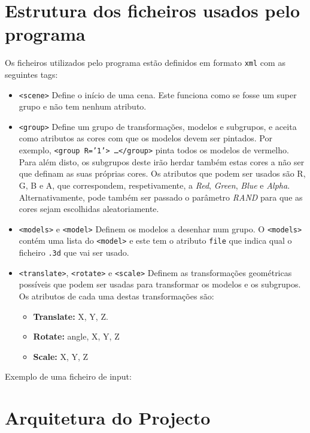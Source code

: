 \documentclass[a4paper]{article}
\begin{document}
\section{Estrutura dos ficheiros usados pelo programa}\label{sec:estrutura-ficheiros}

Os ficheiros utilizados pelo programa estão definidos em formato \texttt{xml} com as seguintes tags:
\begin{itemize}
    \item \texttt{<scene>} Define o início de uma cena. Este funciona como se fosse um super grupo e não tem nenhum atributo.
    \item \texttt{<group>} Define um grupo de transformações, modelos e
        subgrupos, e aceita como atributos as cores com que os modelos devem ser pintados.
        Por exemplo,
        \texttt{<group R='1'> \ldots </group>} pinta todos os modelos de vermelho.
        Para além disto, os subgrupos deste irão herdar também estas cores a não ser
        que definam as suas próprias cores. Os atributos que podem ser usados 
        são R, G, B e A, que correspondem, respetivamente, a \textit{Red},
        \textit{Green}, \textit{Blue} e \textit{Alpha}. Alternativamente, pode também ser passado
        o parâmetro \textit{RAND} para que as cores sejam escolhidas aleatoriamente.
    \item \texttt{<models>} e \texttt{<model>} Definem os modelos a desenhar
        num grupo. O \texttt{<models>} contém uma lista do \texttt{<model>} e este tem o atributo
        \texttt{file} que indica qual o ficheiro \texttt{.3d} que vai ser usado.
    \item \texttt{<translate>}, \texttt{<rotate>} e \texttt{<scale>} Definem as
        transformações geométricas possíveis que podem ser usadas para transformar os
        modelos e os subgrupos. Os atributos de cada uma destas transformações são:
        \begin{itemize}
            \item \textbf{Translate:} X, Y, Z.
            \item \textbf{Rotate:} angle, X, Y, Z
            \item \textbf{Scale:} X, Y, Z
        \end{itemize}
\end{itemize}

\pagebreak
Exemplo de uma ficheiro de input:


\pagebreak

\section{Arquitetura do Projecto}
\end{document}
